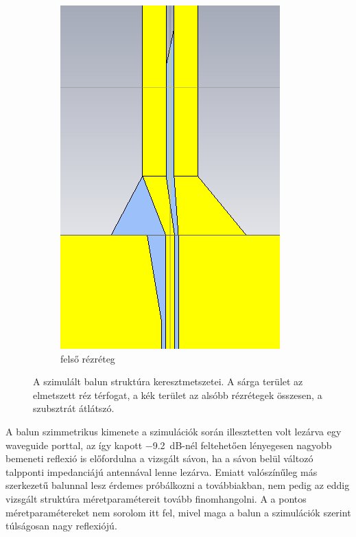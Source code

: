 \begin{figure}[h]
\begin{subfigure}[b]{0.3\textwidth}
		\includegraphics[width=\textwidth]{kep/results/balun_3.png}
		\caption{felső rézréteg}
	\end{subfigure}
	\caption{A szimulált balun struktúra keresztmetszetei. A sárga terület az elmetszett réz térfogat, a kék terület az alsóbb rézrétegek összesen, a szubsztrát átlátszó.}
	\label{fig:balun-kereszt}
\end{figure}
A balun szimmetrikus kimenete a szimulációk során illesztetten volt lezárva egy waveguide porttal, az így kapott \SI{-9,2}{dB}-nél feltehetően lényegesen nagyobb bemeneti reflexió is előfordulna a vizsgált sávon, ha a sávon belül változó talpponti impedanciájú antennával lenne lezárva. Emiatt valószínűleg más szerkezetű balunnal lesz érdemes próbálkozni a továbbiakban, nem pedig az eddig vizsgált struktúra méretparamétereit tovább finomhangolni. A a pontos méretparamétereket nem sorolom itt fel, mivel maga a balun a szimulációk szerint túlságosan nagy reflexiójú.
